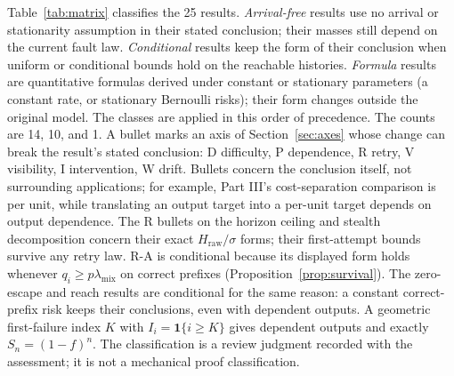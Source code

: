 \documentclass[11pt]{article}
\theoremstyle{definition}
\theoremstyle{remark}
\newcommand{\ind}{\mathbf 1}
\begin{document}
Table~\ref{tab:matrix} classifies the 25 results. \emph{Arrival-free} results use no arrival or
stationarity assumption in their stated conclusion; their masses still depend on the current
fault law. \emph{Conditional} results keep the form of their conclusion when uniform or
conditional bounds hold on the reachable histories. \emph{Formula} results are quantitative
formulas derived under constant or stationary parameters (a constant rate, or stationary
Bernoulli risks); their form changes outside the original model. The classes are applied in
this order of precedence. The counts are 14, 10, and 1.
A bullet marks an axis of Section~\ref{sec:axes} whose change can break the result's stated
conclusion: D difficulty, P dependence, R retry, V visibility, I intervention, W drift. Bullets
concern the conclusion itself, not surrounding applications; for example, Part III's
cost-separation comparison is per unit, while translating an output target into a per-unit target
depends on output dependence. The R bullets on the horizon ceiling and stealth decomposition
concern their exact $H_{\mathrm{raw}}/\sigma$ forms; their first-attempt bounds survive any retry
law. R-A is conditional because its displayed form holds whenever
$q_i\ge p\lambda_{\mathrm{mix}}$ on correct prefixes (Proposition~\ref{prop:survival}). The
zero-escape and reach results are conditional for the same reason: a constant correct-prefix
risk keeps their conclusions, even with dependent outputs. A geometric first-failure index $K$
with $I_i=\ind\{i\ge K\}$ gives dependent outputs and exactly $S_n=(1-f)^n$. The classification
is a review judgment recorded with the assessment; it is not a mechanical proof classification.
\end{document}
